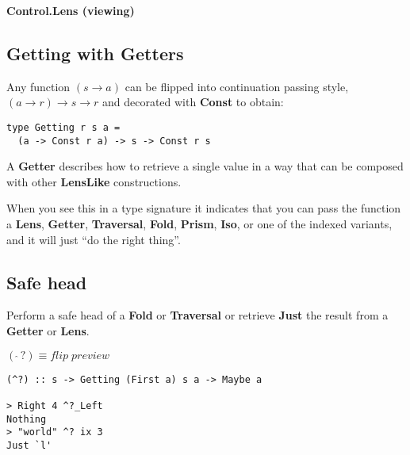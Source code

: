 

\addtolength{\wpXoffset}{5.5cm}
\addtolength{\wpYoffset}{13.1cm}





{\huge \bfseries Control.Lens (viewing) \\[0.2cm]}

\HRule%

\begin{multicols}{2}

\begin{box1}
\subsection *{Getting with Getters}

Any function $(s \to a)$ can be flipped into continuation passing style, $(a \to r)
\to s \to r$ and decorated with \textbf{Const} to obtain:

\begin{verbatim}
type Getting r s a =
  (a -> Const r a) -> s -> Const r s
\end{verbatim}
A \textbf{Getter} describes how to retrieve a single value in a way that can be composed
with other \textbf{LensLike} constructions.

When you see this in a type signature it indicates that you can pass the
function a \textbf{Lens}, \textbf{Getter}, \textbf{Traversal}, \textbf{Fold},
\textbf{Prism}, \textbf{Iso}, or one of the indexed
variants, and it will just ``do the right thing''.
\end{box1}

\begin{box2}
\subsection *{Safe head}
Perform a safe head of a \textbf{Fold} or \textbf{Traversal} or retrieve
\textbf{Just} the result from a \textbf{Getter} or \textbf{Lens}.

$ (\ \hat{}\,?) \equiv flip\;preview $

\begin{verbatim}
(^?) :: s -> Getting (First a) s a -> Maybe a

> Right 4 ^?_Left
Nothing
> "world" ^? ix 3
Just `l'
\end{verbatim}
\end{box2}


\end{multicols}
